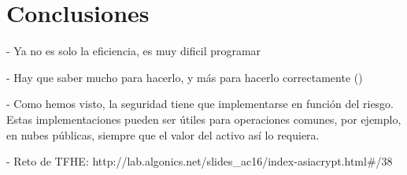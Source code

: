 \chapter{Conclusiones}
\label{chap:conclusiones}

- Ya no es solo la eficiencia, es muy dificil programar

- Hay que saber mucho para hacerlo, y más para hacerlo correctamente (\cite{peng_danger_2019})

- Como hemos visto, la seguridad tiene que implementarse en función del riesgo. Estas implementaciones pueden ser útiles para operaciones comunes, por ejemplo, en nubes públicas, siempre que el valor del activo así lo requiera.

- Reto de TFHE: http://lab.algonics.net/slides_ac16/index-asiacrypt.html#/38
